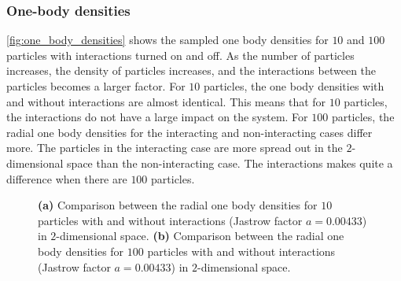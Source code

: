 \subsubsection{One-body densities}
\autoref{fig:one_body_densities} shows the sampled one body densities for $10$ and $100$ particles with interactions turned on and off. As the number of particles increases, the density of particles increases, and the interactions between the particles becomes a larger factor. For $10$ particles, the one body densities with and without interactions are almost identical. This means that for $10$ particles, the interactions do not have a large impact on the system. For $100$ particles, the radial one body densities for the interacting and non-interacting cases differ more. The particles in the interacting case are more spread out in the $2$-dimensional space than the non-interacting case. The interactions makes quite a difference when there are $100$ particles. 
\begin{figure}[H]
\centering
{} 
\qquad
{}
\caption{\textbf{(a)} Comparison between the radial one body densities for $10$ particles with and without interactions (Jastrow factor $a=0.00433$) in $2$-dimensional space. \textbf{(b)} Comparison between the radial one body densities for $100$ particles with and without interactions (Jastrow factor $a=0.00433$) in $2$-dimensional space.}
\label{fig:one_body_densities}
\end{figure}

